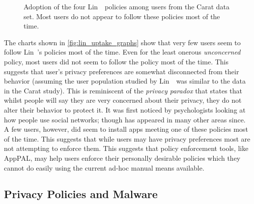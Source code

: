 \documentclass[thesis.tex]{subfiles}
\begin{document}
\begin{figure}
{  }
  \vspace{2em}
  \caption[Adoption of Lin~\etal~policies.]{Adoption of the four Lin~\etal~policies among users from the Carat data set.  Most users do not appear to follow these policies most of the time.}
  \label{fig:lin_uptake_graphs}
\end{figure}

The charts shown in \autoref{fig:lin_uptake_graphs} show that very few
users seem to follow Lin~\etal's policies most of the
time. Even for the least onerous
\emph{unconcerned} policy, most users did not seem to follow the
policy most of the time.  This suggests that user's privacy preferences are somewhat disconnected from their behavior (assuming the user population
studied by Lin~\etal~was similar to the data in the Carat study).
This is reminiscent of
the \emph{privacy paradox} that states that whilst
people will say they are very concerned about their privacy, they do
not alter their behavior to protect it.  It was first noticed by
psychologists looking at how people use social networks; though has
appeared in many other areas since. 
A few users, however, did seem to install apps meeting one of these
policies most of the time.  This suggests that while users may have
privacy preferences most are not attempting to enforce them.  This
suggests that policy enforcement tools, like AppPAL, may help users
enforce their personally desirable policies which they cannot do
easily using the current ad-hoc manual means available.

\subsection{Privacy Policies and Malware}
\end{document}
